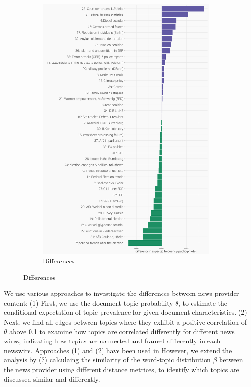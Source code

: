 \documentclass[12pt,a4paper,notitlepage]{article}
\begin{document}
\begin{figure}[H]
\begin{center}
	\begin{subfigure}[normla]{0.4\textwidth}
		\includegraphics[width=\textwidth,keepaspectratio]{../figs/topic_proportion_diff.png}
		\caption{Differences}
		\label{fig_topic_proportion_diff}
	\end{subfigure}
\end{center}
\end{figure}

We use various approaches to investigate the differences between news provider content: (1) First, we use the document-topic probability $\theta$, to estimate the conditional expectation of topic prevalence for given document characteristics. (2) Next, we find all edges between topics where they exhibit a positive correlation of $\theta$ above 0.1 to examine how topics are correlated differently for different news wires, indicating how topics are connected and framed differently in each newswire. Approaches (1) and (2) have been used in \citep{roberts_model_2016}  However, we extend the analysis by (3) calculaing the similarity of the word-topic distribution $\beta$ between the news provider using different distance metrices, to identify which topics are discussed similar and differently. 
\end{document}
